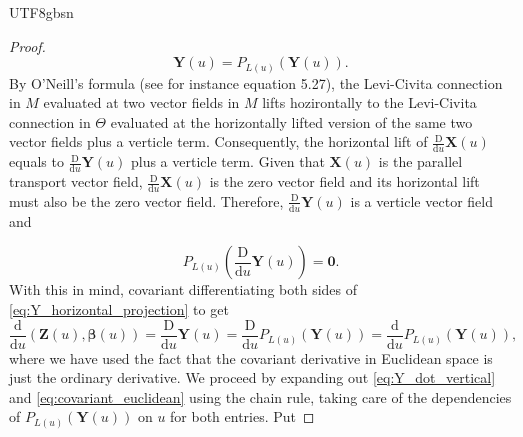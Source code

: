 \documentclass[12pt]{report}
\theoremstyle{plain}
\theoremstyle{definition}
\begin{document}
\begin{CJK*}{UTF8}{gbsn}
\begin{proof}
\begin{equation}\label{eq:Y_horizontal_projection}
  \bm{Y}(u) = P_{L(u)}(\bm{Y}(u)).
\end{equation}
By O'Neill's formula (see for instance \cite{Lee_2018} equation 5.27), 
the Levi-Civita connection 
in $M$ evaluated at two vector fields in $M$ lifts hozirontally
to the Levi-Civita connection 
in $\Theta$ evaluated at the horizontally 
lifted version of the same two vector fields
plus a verticle term.
Consequently, the horizontal lift of 
$\frac{\mathrm{D}}{\mathrm{d} u} \bm{X}(u)$ 
equals to $\frac{\mathrm{D}}{\mathrm{d} u} \bm{Y}(u)$
plus a verticle term.
Given that $\bm{X}(u)$ is the parallel transport vector field,
$\frac{\mathrm{D}}{\mathrm{d} u} \bm{X}(u)$ is the zero vector field 
and its horizontal lift must also be the zero vector field.
Therefore, $\frac{\mathrm{D}}{\mathrm{d} u} \bm{Y}(u)$
is a verticle vector field and 

\begin{equation}\label{eq:Y_dot_vertical}
  P_{L(u)}(\frac{\mathrm{D}}{\mathrm{d} u} \bm{Y}(u)) = \bm{0}.
\end{equation}
With this in mind, 
covariant differentiating both sides of 
\eqref{eq:Y_horizontal_projection} to get
\begin{equation}\label{eq:covariant_euclidean}
  \frac{\mathrm{d}}{\mathrm{d} u} (\bm{Z}(u), \bm{\beta}(u))
  = \frac{\mathrm{D}}{\mathrm{d} u} \bm{Y}(u)
  = \frac{\mathrm{D}}{\mathrm{d} u} P_{L(u)}(\bm{Y}(u))
  = \frac{\mathrm{d}}{\mathrm{d} u} P_{L(u)}(\bm{Y}(u)),
\end{equation}
where we have used the fact that 
the covariant derivative in Euclidean space 
is just the ordinary derivative.  
We proceed by expanding out 
\eqref{eq:Y_dot_vertical} and \eqref{eq:covariant_euclidean}
using the chain rule, taking care of 
the dependencies of 
$P_{L(u)}(\bm{Y}(u))$ on $u$ for both entries.
Put 


\end{proof}
\end{CJK*}
\end{document}
